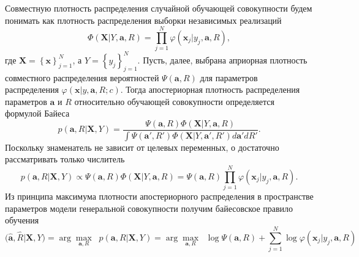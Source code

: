 \documentclass[12pt,a4paper]{amsart}
\begin{document}
Совместную плотность распределения случайной обучающей совокупности будем понимать как плотность 
распределения выборки независимых реализаций
$$\Phi(\mathbf{X}|Y,\mathbf{a},R)=\prod \limits_{j=1}^N \varphi(\mathbf{x}_j|y_j,\mathbf{a},R),$$ 
где $\mathbf{X}= \left\{\mathbf{x}\right\}_{j=1}^N$, а $Y = \left\{y_j\right\}_{j=1}^N$.
Пусть, далее, выбрана априорная плотность совместного распределения вероятностей $\Psi(\mathbf{a},R)$ 
для параметров распределения $\varphi \left( {\mathbf x | y,\mathbf{a},R;c} \right)$. Тогда апостериорная
 плотность распределения параметров $\mathbf{a}$ и $R$ относительно обучающей совокупности определяется 
формулой Байеса
$$p(\mathbf{a},R|\mathbf{X},Y)=\frac{\Psi(\mathbf{a},R) \Phi(\mathbf{X}|Y,\mathbf{a},R)}
{\int {\Psi(\mathbf{a}',R') \Phi(\mathbf{X}|Y,\mathbf{a}',R')d\mathbf{a}'dR'}}.$$
Поскольку знаменатель не зависит от целевых переменных, о достаточно рассматривать только числитель
$$p(\mathbf{a},R|\mathbf{X},Y) \propto \Psi(\mathbf{a},R) \Phi(\mathbf{X}|Y,\mathbf{a},R) = 
\Psi(\mathbf{a},R) \prod \limits_{j=1}^N \varphi(\mathbf{x}_j|y_j,\mathbf{a},R).$$
Из принципа максимума плотности апостериорного распределения в пространстве параметров модели генеральной
 совокупности получим байесовское правило обучения
$$\bigl(\hat{\mathbf{a}},\hat{R}|\mathbf{X},Y\bigr) = \arg\underset{\mathbf{a},R}{\max}\;\; p(\mathbf{a},R|\mathbf{X},Y) =
\arg\underset{\mathbf{a},R}{\max}\;\; {\log}\Psi(\mathbf{a},R) + \sum\limits_{j=1}^N{\log}\varphi(\mathbf{x}_j|y_j,\mathbf{a},R) $$
\end{document}
